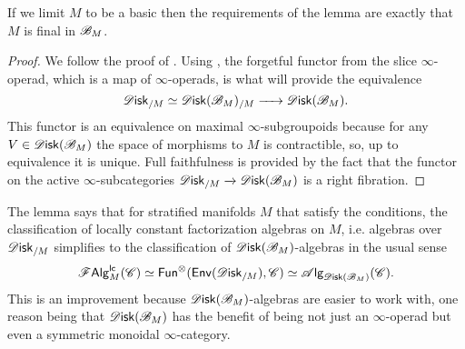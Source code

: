 \documentclass[../text]{subfiles}
\begin{document}
\begin{remark}
    If we limit $M$ to be a basic then the requirements of the lemma are exactly that $M$ is final in $\mathscr{B}_M$.
\end{remark}

\begin{proof}
    We follow the proof of \cite[cor.2.33]{aft_fhstrat}. Using , the forgetful functor from the slice $\infty$-operad, which is a map of $\infty$-operads, is what will provide the equivalence
    \begin{equation}
        \disk_{/M} \simeq \disk(\bstr_M)_{/M} \xrightarrow{\ \ \ \ } \disk(\bstr_M).
    \end{equation}
    This functor is an equivalence on maximal $\infty$-subgroupoids because for any $V \in \disk(\bstr_M)$ the space of morphisms to $M$ is contractible, so, up to equivalence it is unique. %
    Full faithfulness is provided by the fact that the functor on the active $\infty$-subcategories $\disk_{/M} \xrightarrow{} \disk(\bstr_M)$ is a right fibration. 
\end{proof}

The lemma says that for stratified manifolds $M$ that satisfy the conditions, the classification of locally constant factorization algebras on $M$, i.e. algebras over $\disk_{/M}$ simplifies to the classification of $\disk(\bstr_M)$-algebras in the usual sense
%
\begin{equation}
    \lcfa_M (\catC) \simeq \mathsf{Fun}^\otimes (\mathsf{Env}(\disk_{/M}), \catC) \simeq \alg{\disk(\bstr_M)} (\catC).
\end{equation}
%
This is an improvement because $\disk(\bstr_M)$-algebras are easier to work with, one reason being that $\disk(\bstr_M)$ has the benefit of being not just an $\infty$-operad but even a symmetric monoidal $\infty$-category.
\end{document}
